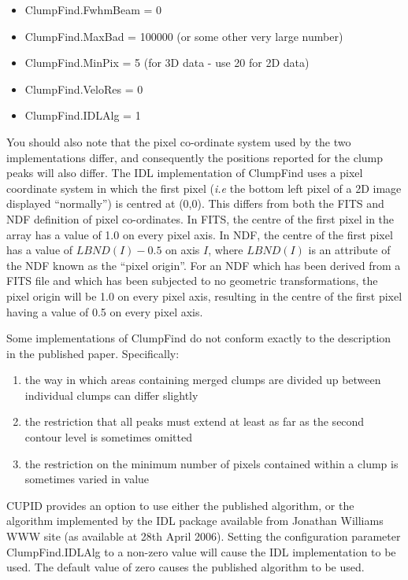 \documentclass[twoside,11pt]{article}
\renewcommand{\_}{\texttt{\symbol{95}}}
\begin{document}
\begin{itemize}
\item ClumpFind.FwhmBeam = 0
\item ClumpFind.MaxBad = 100000  (or some other very large number)
\item ClumpFind.MinPix = 5 (for 3D data - use 20 for 2D data)
\item ClumpFind.VeloRes = 0
\item ClumpFind.IDLAlg = 1
\end{itemize}

You should also note that the pixel co-ordinate system used by the two
implementations differ, and consequently the positions reported for the
clump peaks will also differ. The IDL implementation of ClumpFind uses a
pixel coordinate system in which the first pixel (\emph{i.e} the bottom
left pixel of a 2D image displayed ``normally'') is centred at (0,0).
This differs from both the FITS and NDF definition of pixel co-ordinates.
In FITS, the centre of the first pixel in the array has a value of 1.0 on
every pixel axis. In NDF, the centre of the first pixel has a value of
$LBND(I) - 0.5$ on axis $I$, where $LBND(I)$ is an attribute of the NDF
known as the ``pixel origin''. For an NDF which has been derived from a
FITS file and which has been subjected to no geometric transformations,
the pixel origin will be 1.0 on every pixel axis, resulting in the centre
of the first pixel having a value of 0.5 on every pixel axis.

Some implementations of ClumpFind do not conform exactly to the description 
in the published paper. Specifically:

\begin{enumerate}

\item the way in which areas containing merged clumps are divided up between
individual clumps can differ slightly

\item the restriction that all peaks must extend at least as far as the 
second contour level is sometimes omitted

\item the restriction on the minimum number of pixels contained within a 
clump is sometimes varied in value

\end{enumerate}

CUPID provides an option to use either the published algorithm, or the
algorithm implemented by the IDL package available from Jonathan Williams
WWW site (as available at 28th April 2006). Setting the configuration
parameter ClumpFind.IDLAlg to a non-zero value will cause the IDL
implementation to be used. The default value of zero causes the published
algorithm to be used.
\end{document}
